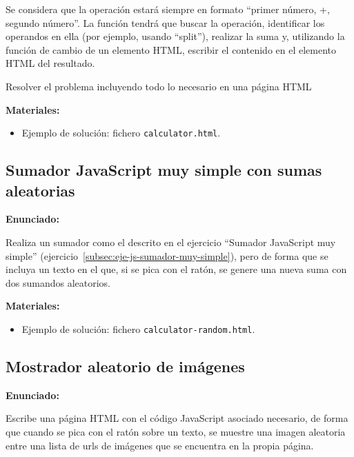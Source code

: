 Se considera que la operación estará siempre en formato ``primer número, +, segundo número''. La función tendrá que buscar la operación, identificar los operandos en ella (por ejemplo, usando ``split''), realizar la suma y, utilizando la función de cambio de un elemento HTML, escribir el contenido en el elemento HTML del resultado.

Resolver el problema incluyendo todo lo necesario en una página HTML

\textbf{Materiales:}

\begin{itemize}
\item Ejemplo de solución: fichero \verb|calculator.html|.
\end{itemize}


\subsection{Sumador JavaScript muy simple con sumas aleatorias}
\label{subsec:eje-js-sumador-aleatorio}


\textbf{Enunciado:}

Realiza un sumador como el descrito en el ejercicio ``Sumador JavaScript muy simple'' (ejercicio~\ref{subsec:eje-js-sumador-muy-simple}), pero de forma que se incluya un texto en el que, si se pica con el ratón, se genere una nueva suma con dos sumandos aleatorios.

\textbf{Materiales:}

\begin{itemize}
\item Ejemplo de solución: fichero \verb|calculator-random.html|.
\end{itemize}


\subsection{Mostrador aleatorio de imágenes}
\label{subsec:eje-js-imagenes-aleatorio}


\textbf{Enunciado:}

Escribe una página HTML con el código JavaScript asociado necesario, de forma que cuando se pica con el ratón sobre un texto, se muestre una imagen aleatoria entre una lista de urls de imágenes que se encuentra en la propia página.

